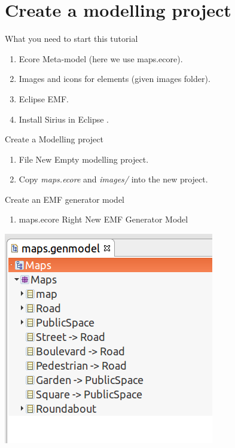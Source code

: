 \section{Create a modelling project}

\begin{frame}{What you need to start this tutorial}


	\begin{enumerate}
		\item Ecore Meta-model (here we use maps.ecore).
		\item Images and icons for elements (given images folder).
		\item Eclipse EMF.
		\item Install Sirius in Eclipse .
	\end{enumerate}

\end{frame}	

\begin{frame}{Create a Modelling project}


	\begin{enumerate}
		\item File \ra New \ra Empty modelling project.
		\item Copy {\it maps.ecore} and {\it images/} into the new project.		
	\end{enumerate}

\end{frame}

\begin{frame}{Create an EMF generator model}


	\begin{enumerate}
		\item maps.ecore Right \ra New \ra EMF Generator Model
	\end{enumerate}

	\includegraphics[scale=0.3]{figs/genmodel.png}

\end{frame}


